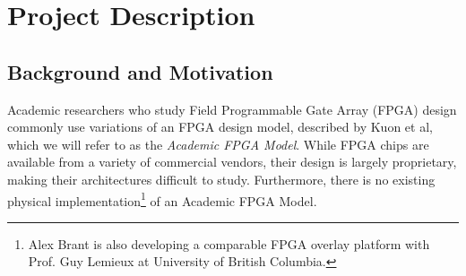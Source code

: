 \section{Project Description}

\subsection{Background and Motivation}

%
%
%

Academic researchers who study Field Programmable Gate Array (FPGA) design commonly use variations of an FPGA design model, described by Kuon et al\cite{fpga}, which we will refer to as the \emph{Academic FPGA Model}.
While FPGA chips are available from a variety of commercial vendors, their design is largely proprietary, making their architectures difficult to study.\citationneeded
Furthermore, there is no existing physical implementation\footnote{Alex Brant is also developing a comparable FPGA overlay platform with Prof. Guy Lemieux at University of British Columbia.} of an Academic FPGA Model.

